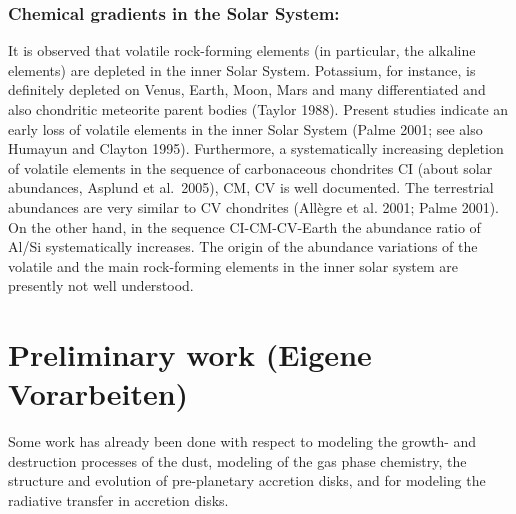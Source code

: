 
\subsubsection{Chemical gradients in the Solar System:}
It is observed that volatile rock-forming elements (in particular,
the alkaline elements) are depleted in the inner Solar System.
Potassium, for instance, is definitely depleted on Venus, Earth,
Moon, Mars and many differentiated and also chondritic meteorite parent bodies
(Taylor 1988). Present studies indicate an early loss of volatile
elements in the inner Solar System (Palme 2001; see also Humayun and Clayton 1995).
Furthermore, a systematically increasing depletion of volatile elements
in the sequence of carbonaceous chondrites CI (about solar
abundances, Asplund et al.~2005), CM, CV is well documented. The
terrestrial abundances are very similar to CV chondrites (All\`egre et al.
2001; Palme 2001). On the other hand, in the sequence CI-CM-CV-Earth the
abundance ratio of Al/Si systematically increases. The
origin of the abundance variations of the volatile and the main
rock-forming elements in the inner solar system are presently not well understood.

\section{Preliminary work (Eigene Vorarbeiten)}
Some work has already been done with respect to modeling the growth-
and destruction processes of the dust, modeling of the gas phase
chemistry, the structure and evolution of pre-planetary accretion
disks, and for modeling the radiative transfer in accretion disks.

